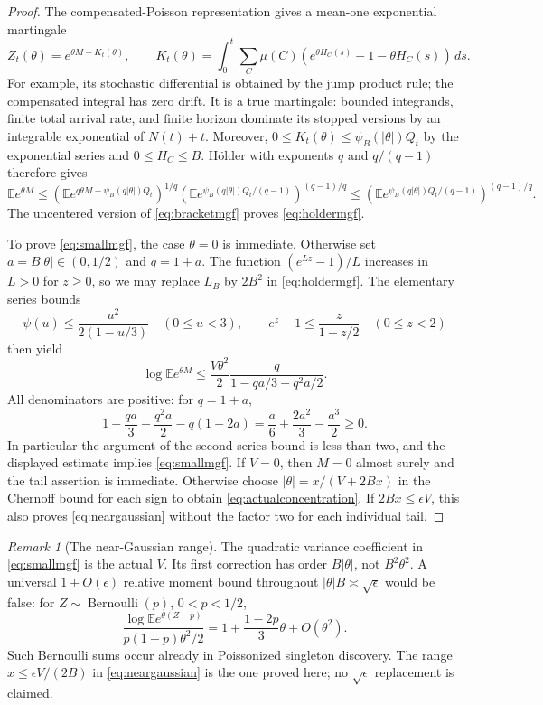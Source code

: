 \documentclass[11pt]{article}
\numberwithin{equation}{section}
\theoremstyle{definition}
\theoremstyle{remark}
\newtheorem{remark}[theorem]{Remark}
\newcommand{\E}{\mathbb E}
\begin{document}
\begin{proof}
The compensated-Poisson representation gives a mean-one exponential martingale
\begin{equation}\label{eq:exp-mart}
 Z_t(\theta)=e^{\theta M-K_t(\theta)},\qquad
 K_t(\theta)=\int_0^t\sum_C\mu(C)
       (e^{\theta H_C(s)}-1-\theta H_C(s))\,ds.
\end{equation}
For example, its stochastic differential is obtained by the jump product rule;
the compensated integral has zero drift. It is a true martingale: bounded
integrands, finite total arrival rate, and finite horizon dominate its stopped
versions by an integrable exponential of $N(t)+t$. Moreover,
$0\le K_t(\theta)\le\psi_B(|\theta|)Q_t$ by the exponential series and
$0\le H_C\le B$.
H\"older with exponents $q$ and $q/(q-1)$ therefore gives
\[
 \E e^{\theta M}
 \le\left(\E e^{q\theta M-\psi_B(q|\theta|)Q_t}\right)^{1/q}
      \left(\E e^{\psi_B(q|\theta|)Q_t/(q-1)}\right)^{(q-1)/q}
 \le\left(\E e^{\psi_B(q|\theta|)Q_t/(q-1)}\right)^{(q-1)/q}.
\]
The uncentered version of \eqref{eq:bracketmgf} proves \eqref{eq:holdermgf}.

To prove \eqref{eq:smallmgf}, the case $\theta=0$ is immediate. Otherwise
set $a=B|\theta|\in(0,1/2)$ and $q=1+a$. The function
$(e^{Lz}-1)/L$ increases in $L>0$ for $z\ge0$, so we may replace $L_B$
by $2B^2$ in \eqref{eq:holdermgf}. The elementary series bounds
\[
 \psi(u)\le\frac{u^2}{2(1-u/3)}\quad(0\le u<3),\qquad
 e^z-1\le\frac z{1-z/2}\quad(0\le z<2)
\]
then yield
\[
 \log\E e^{\theta M}
 \le\frac{V\theta^2}{2}
       \frac q{1-qa/3-q^2a/2}.
\]
All denominators are positive: for $q=1+a$,
\[
 1-\frac{qa}{3}-\frac{q^2a}{2}-q(1-2a)
 =\frac a6+\frac{2a^2}{3}-\frac{a^3}{2}\ge0.
\]
In particular the argument of the second series bound is less than two,
and the displayed estimate implies \eqref{eq:smallmgf}.
If $V=0$, then $M=0$ almost surely and the tail assertion is immediate.
Otherwise choose $|\theta|=x/(V+2Bx)$ in the Chernoff bound for each sign to obtain
\eqref{eq:actualconcentration}. If $2Bx\le\epsilon V$, this also proves
\eqref{eq:neargaussian} without the factor two for each individual tail.
\end{proof}

\begin{remark}[The near-Gaussian range]\label{rem:gaussianrange}
The quadratic variance coefficient in \eqref{eq:smallmgf} is the actual $V$.
Its first correction has order $B|\theta|$, not $B^2\theta^2$.
A universal $1+O(\epsilon)$ relative moment bound throughout
$|\theta|B\asymp\sqrt\epsilon$ would be false: for
$Z\sim\operatorname{Bernoulli}(p)$, $0<p<1/2$,
\[
 \frac{\log\E e^{\theta(Z-p)}}{p(1-p)\theta^2/2}
 =1+\frac{1-2p}{3}\theta+O(\theta^2).
\]
Such Bernoulli sums occur already in Poissonized singleton discovery.
The range $x\le\epsilon V/(2B)$ in \eqref{eq:neargaussian} is the one
proved here; no $\sqrt\epsilon$ replacement is claimed.
\end{remark}
\end{document}
